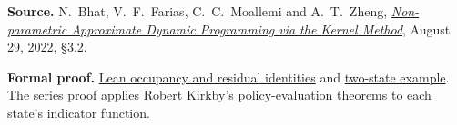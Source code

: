 \documentclass[12pt,a4paper]{article}
\begin{document}
\smallskip
{\small
\textbf{Source.} N.~Bhat, V.~F.~Farias, C.~C.~Moallemi and A.~T.~Zheng,
\href{https://moallemi.com/ciamac/papers/kernel-adp-2012.pdf\#page=12}{\emph{Non-parametric Approximate Dynamic Programming via the Kernel Method}},
August 29, 2022, \S3.2.\par
\textbf{Formal proof.}
\href{https://github.com/nikhilpb/kadp/blob/main/Kadp/Occupancy.lean}{Lean occupancy and residual identities}
and \href{https://github.com/nikhilpb/kadp/blob/main/Kadp/Examples/Occupancy.lean}{two-state example}.
The series proof applies
\href{https://github.com/LeanEconomics/DynamicProgramming/blob/9d4783f3fb282444f8f3a91c4e6439293dd4bacc/FiniteStates/MarkovDecisionProcesses/MarkovDecisionProcesses/MDP.lean}{Robert Kirkby's policy-evaluation theorems}
to each state's indicator function.}
\end{document}
